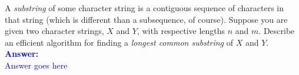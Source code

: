 \item{}
A \emph{substring} of some character string is a contiguous sequence of
characters in that string (which is different than a subsequence, of course).
Suppose you are given two character strings, $X$ and $Y$, with respective
lengths $n$ and $m$. Describe an efficient algorithm for finding a \emph{longest
common substring} of $X$ and $Y$.\\[12pt]
\ifanswers
\textcolor{blue}{
\textbf{Answer:}\\[6pt]
Answer goes here
}
\newpage
\fi

